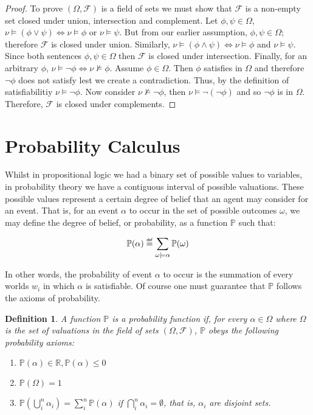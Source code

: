 \documentclass{amsart}
\newcommand\defeq{\mathrel{\overset{\makebox[0pt]{\mbox{\normalfont\tiny\sffamily def}}}{=}}}
\theoremstyle{plain}
\newtheorem*{definition}{Definition}
\newcommand{\pr}{\mathbb{P}}
\begin{document}
\begin{proof}
  To prove $(\Omega,\mathcal{F})$ is a field of sets we must show that $\mathcal{F}$ is a non-empty
  set closed under union, intersection and complement. Let $\phi,\psi \in \Omega$, $\nu \models
  (\phi \vee \psi) \iff \nu \models \phi$ or $\nu \models \psi$. But from our earlier assumption,
  $\phi,\psi \in \Omega$; therefore $\mathcal{F}$ is closed under union. Similarly, $\nu \models
  (\phi \wedge \psi) \iff \nu \models \phi$ and $\nu \models \psi$. Since both sentences $\phi,\psi
  \in \Omega$ then $\mathcal{F}$ is closed under intersection. Finally, for an arbitrary $\phi$,
  $\nu \models \neg \phi \iff \nu \not\models \phi$. Assume $\phi \in \Omega$. Then $\phi$
  satisfies in $\Omega$ and therefore $\neg\phi$ does not satisfy lest we create a contradiction.
  Thus, by the definition of satisfiabilitiy $\nu \models \neg\phi$. Now consider $\nu \not\models
  \neg\phi$, then $\nu \models \neg(\neg\phi)$ and so $\neg\phi$ is in $\Omega$. Therefore,
  $\mathcal{F}$ is closed under complements.
\end{proof}

\section{Probability Calculus}

Whilst in propositional logic we had a binary set of possible values to variables, in probability
theory we have a contiguous interval of possible valuations. These possible values represent a
certain degree of belief that an agent may consider for an event. That is, for an event $\alpha$
to occur in the set of possible outcomes $\omega$, we may define the degree of belief, or
probability, as a function $\pr$ such that:

\begin{equation*}
  \pr(\alpha) \defeq \sum_{\omega\models\alpha} \pr(\omega)
\end{equation*}

In other words, the probability of event $\alpha$ to occur is the summation of every worlds $w_i$
in which $\alpha$ is satisfiable. Of course one must guarantee that $\pr$ follows the axioms of
probability.

\begin{definition}
  A function $\pr$ is a probability function if, for every $\alpha \in \Omega$ where $\Omega$ is
  the set of valuations in the field of sets $(\Omega,\mathcal{F})$, $\pr$ obeys the following
  probability axioms:

  \begin{enumerate}
    \item $\pr(\alpha) \in \mathbb{R}, \pr(\alpha) \leq 0$
    \item $\pr(\Omega)=1$
    \item $\pr(\bigcup_i^n \alpha_i) = \sum_i^n \pr(\alpha)$ if $\bigcap_i^n \alpha_i=\emptyset$,
      that is, $\alpha_i$ are disjoint sets.
  \end{enumerate}
\end{definition}
\end{document}
